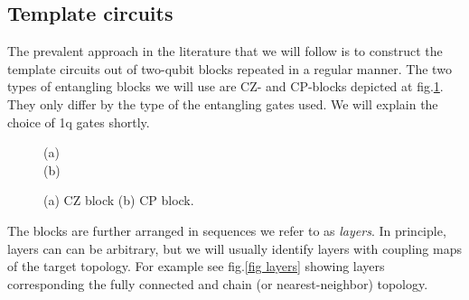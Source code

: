 \documentclass[draft, amsfonts, amssymb, aps, nofootinbib, twocolumn]{revtex4-2}
\begin{document}
\subsection{Template circuits}
The prevalent approach in the literature \cite{Khatri2019, Madden2021, Rakyta2021, Nakanishi2021, Rakyta2022} that we will follow is to construct the template circuits out of two-qubit blocks repeated in a regular manner. The two types of entangling blocks we will use are CZ- and CP-blocks depicted at fig.\ref{fig blocks}. They only differ by the type of the entangling gates used. We will explain the choice of 1q gates shortly.
\begin{figure}
\begin{flushleft}
(a)
\\
(b)
\end{flushleft}
\caption{(a) CZ block (b) CP block.}
\label{fig blocks}
\end{figure}
The blocks are further arranged in sequences we refer to as \textit{layers}. In principle, layers can can be arbitrary, but we will usually identify layers with coupling maps of the target topology. For example see fig.\ref{fig layers} showing layers corresponding the fully connected and chain (or nearest-neighbor) topology.
\end{document}
